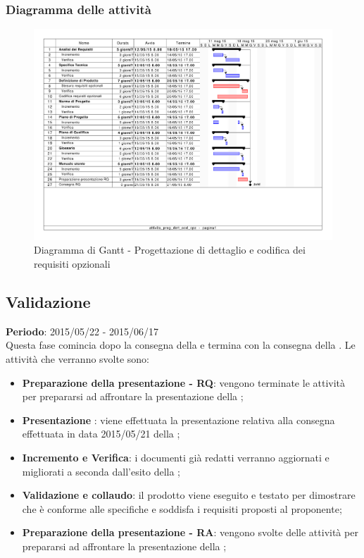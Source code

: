 		\subsubsection{Diagramma delle attività} %
		\label{ssub:diagramma_delle_attivita}
			\begin{figure}[htbp]
				\centering
				\centerline{\includegraphics[scale=0.7]{images/d_attivita_prog_dett_cod_opz.pdf}}
				\caption{Diagramma di Gantt - Progettazione di dettaglio e codifica dei requisiti opzionali}
				\label{fig:gantt_prog_dett_cod_requisiti_opzionali}				
			\end{figure}
	
	\subsection{Validazione} %
	\label{sub:validazione}
	\textbf{Periodo}:  2015/05/22 - 2015/06/17 \\
	Questa fase comincia dopo la consegna della \RQ{} e termina con la consegna della \RA.
	Le attività che verranno svolte sono:
		\begin{itemize}
			\item \textbf{Preparazione della presentazione - RQ}: vengono terminate le attività per prepararsi ad affrontare la presentazione della \RQ;
			\item \textbf{Presentazione \RQ}: viene effettuata la presentazione relativa alla consegna effettuata in data 2015/05/21 della \RQ;
			\item \textbf{Incremento e Verifica}: i documenti già redatti verranno aggiornati e migliorati a seconda dall'esito della \RQ;
			\item \textbf{Validazione e collaudo}: il prodotto viene eseguito e testato per dimostrare che è conforme alle specifiche e soddisfa i requisiti proposti al proponente;
			\item \textbf{Preparazione della presentazione - RA}: vengono svolte delle attività per prepararsi ad affrontare la presentazione della \RA;
		\end{itemize}
		
